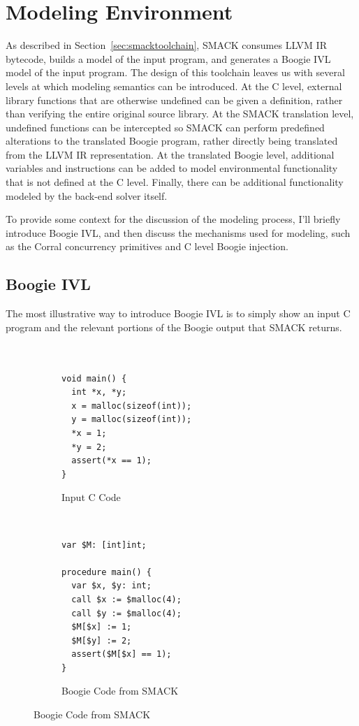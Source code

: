 \section{Modeling Environment}\label{sec:modelingenvironment}
As described in Section~\ref{sec:smacktoolchain}, SMACK consumes LLVM
IR bytecode, builds a model of the input program, and generates a
Boogie IVL model of the input program.  The design of this toolchain
leaves us with several levels at which modeling semantics can be
introduced. At the C level, external library functions that are
otherwise undefined can be given a definition, rather than verifying
the entire original source library. At the SMACK translation level,
undefined functions can be intercepted so SMACK can perform predefined
alterations to the translated Boogie program, rather directly being
translated from the LLVM IR representation.  At the translated Boogie
level, additional variables and instructions can be added to model
environmental functionality that is not defined at the C
level. Finally, there can be additional functionality modeled by the
back-end solver itself. 

To provide some context for the discussion of the modeling process,
I'll briefly introduce Boogie IVL, and then discuss the mechanisms
used for modeling, such as the Corral concurrency primitives and C
level Boogie injection.

\subsection{Boogie IVL}
The most illustrative way to introduce Boogie IVL is to simply show an
input C program and the relevant portions of the Boogie output that
SMACK returns. 
\begin{figure}[h]
\centering
\caption{SMACK Translation of C Program}\label{fig:cToBoogie}
\begin{subfigure}[b]{.45\textwidth}
\centering
\caption{Input C Code}\label{fig:cToBoogie_a}
\begin{lstlisting}


void main() {
  int *x, *y;
  x = malloc(sizeof(int));
  y = malloc(sizeof(int));
  *x = 1;
  *y = 2;
  assert(*x == 1);
}
\end{lstlisting}
\end{subfigure}
~
\begin{subfigure}[b]{.45\textwidth}
\centering
\caption{Boogie Code from SMACK}\label{fig:cToBoogie_b}
\begin{lstlisting}[language=boogie]
var $M: [int]int;

procedure main() {
  var $x, $y: int;
  call $x := $malloc(4);
  call $y := $malloc(4);
  $M[$x] := 1;
  $M[$y] := 2;
  assert($M[$x] == 1);
}
\end{lstlisting}
\end{subfigure}
\end{figure}

